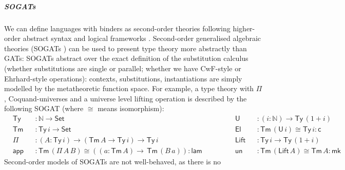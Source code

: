 \documentclass[a4paper,UKenglish,cleveref, autoref, thm-restate]{lipics-v2021}
\newcommand{\ra}{\rightarrow}
\newcommand{\Set}{\mathsf{Set}}
\newcommand{\Ty}{\mathsf{Ty}}
\newcommand{\Tm}{\mathsf{Tm}}
\newcommand{\N}{\mathbb{N}}
\newcommand{\lam}{\mathsf{lam}}
\newcommand{\app}{\mathsf{app}}
\newcommand{\U}{\mathsf{U}}
\newcommand{\El}{\mathsf{El}}
\newcommand{\cd}{\mathsf{c}}
\newcommand{\blank}{\mathord{\hspace{1pt}\text{--}\hspace{1pt}}} %
\renewcommand{\tt}{\mathsf{tt}}
\newcommand{\fst}{\mathsf{fst}}
\newcommand{\snd}{\mathsf{snd}}
\newcommand{\Lift}{\mathsf{Lift}}
\newcommand{\mk}{\mathsf{mk}}
\newcommand{\un}{\mathsf{un}}
\begin{document}
\subparagraph*{SOGATs}
We can define languages with binders as second-order theories
following higher-order abstract syntax \cite{DBLP:conf/lics/Hofmann99}
and logical frameworks
\cite{DBLP:journals/jacm/HarperHP93,10.1007/978-3-642-14203-1_2}. Second-order
generalised algebraic theories (SOGATs
\cite{uemura,DBLP:conf/fscd/KaposiX24}) can be used to present type
theory more abstractly than GATs: SOGATs abstract over the exact
definition of the substitution calculus (whether substitutions are
single or parallel; whether we have CwF-style or Ehrhard-style
operations): contexts, substitutions, instantiations are simply
modelled by the metatheoretic function space. For example, a type
theory with $\Pi$, Coquand-universes and a universe level lifting
operation is described by the following SOGAT (where $\cong$ means
isomorphism):
\begin{equation}\label{eq:tt}
\begin{alignedat}{10}
  & \Ty && : \N\ra\Set                                                             && \U && : (i:\N)\ra\Ty\,(1+i) \\           
  & \Tm && : \Ty\,i\ra\Set                                                         && \El && : \Tm\,(\U\,i)\cong\Ty\,i : \cd \\
  & \Pi && : (A:\Ty\,i)\ra(\Tm\,A\ra\Ty\,i)\ra\Ty\,i                               && \Lift && : \Ty\,i\ra\Ty\,(1+i) \\        
  & \app && : \Tm\,(\Pi\,A\,B)\cong((a:\Tm\,A)\ra\,\Tm\,(B\,a)): \lam \hspace{3em} && \un && : \Tm\,(\Lift\,A)\cong\Tm\,A : \mk
\end{alignedat}
\end{equation}
Second-order models of SOGATs are not well-behaved, as there is no
\end{document}
